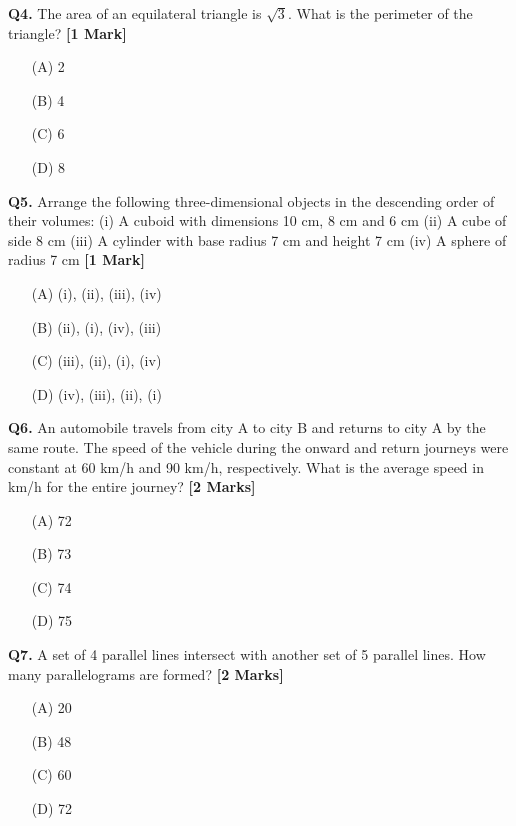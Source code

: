 \documentclass[11pt]{article}
\newcommand{\questiona}[2]{
    \noindent\textbf{Q#2.} #1 \hfill \textbf{[1 Mark]}
}
\newcommand{\questionb}[2]{
    \noindent\textbf{Q#2.} #1 \hfill \textbf{[2 Marks]}
}
\begin{document}
\questiona{The area of an equilateral triangle is \(\sqrt{3}\). What is the perimeter of the triangle?}{4}
\begin{enumerate}
    \item[(A)] 2  
    \item[(B)] 4  
    \item[(C)] 6  
    \item[(D)] 8  
\end{enumerate}

\questiona{Arrange the following three-dimensional objects in the descending order of their volumes: (i) A cuboid with dimensions 10 cm, 8 cm and 6 cm (ii) A cube of side 8 cm (iii) A cylinder with base radius 7 cm and height 7 cm (iv) A sphere of radius 7 cm}{5}
\begin{enumerate}
    \item[(A)] (i), (ii), (iii), (iv)  
    \item[(B)] (ii), (i), (iv), (iii)  
    \item[(C)] (iii), (ii), (i), (iv)  
    \item[(D)] (iv), (iii), (ii), (i)  
\end{enumerate}

\questionb{An automobile travels from city A to city B and returns to city A by the same route. The speed of the vehicle during the onward and return journeys were constant at 60 km/h and 90 km/h, respectively. What is the average speed in km/h for the entire journey?}{6}
\begin{enumerate}
    \item[(A)] 72  
    \item[(B)] 73  
    \item[(C)] 74  
    \item[(D)] 75  
\end{enumerate}

\questionb{A set of 4 parallel lines intersect with another set of 5 parallel lines. How many parallelograms are formed?}{7}
\begin{enumerate}
    \item[(A)] 20  
    \item[(B)] 48  
    \item[(C)] 60  
    \item[(D)] 72  
\end{enumerate}
\end{document}
